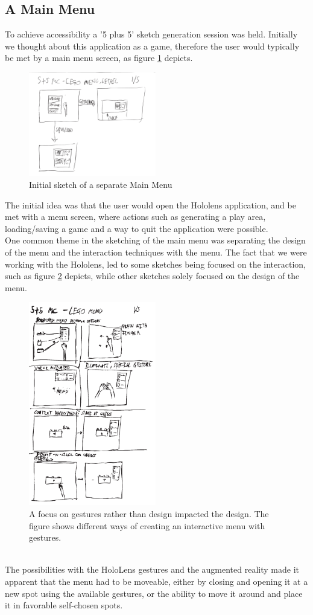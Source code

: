 \subsection{A Main Menu}
To achieve accessibility a '5 plus 5' sketch generation session was held. Initially we thought about this application as a game, therefore the user would typically be met by a main menu screen, as figure \ref{fig:menu8} depicts.
\begin{figure}[t]
	\centering
	\includegraphics[width=210px]{figures/Menu/menu8_1.pdf}
	\caption{Initial sketch of a separate Main Menu}
	\label{fig:menu8}
\end{figure}
The initial idea was that the user would open the Hololens application, and be met with a menu screen, where actions such as generating a play area, loading/saving a game and a way to quit the application were possible. \\
One common theme in the sketching of the main menu was separating the design of the menu and the interaction techniques with the menu. The fact that we were working with the Hololens, led to some sketches being focused on the interaction, such as figure \ref{fig:menugesture} depicts,  while other sketches solely focused on the design of the menu.\\
\begin{figure}[t]
	\centering
	\includegraphics[width=210px]{figures/Menu/menu5_1.pdf}
	\caption{A focus on gestures rather than design impacted the design. The figure shows different ways of creating an interactive menu with gestures.}
	\label{fig:menugesture}
\end{figure}
\\
The possibilities with the HoloLens gestures and the augmented reality made it apparent that the menu had to be moveable, either by closing and opening it at a new spot using the available gestures, or the ability to move it around and place it in favorable self-chosen spots.
